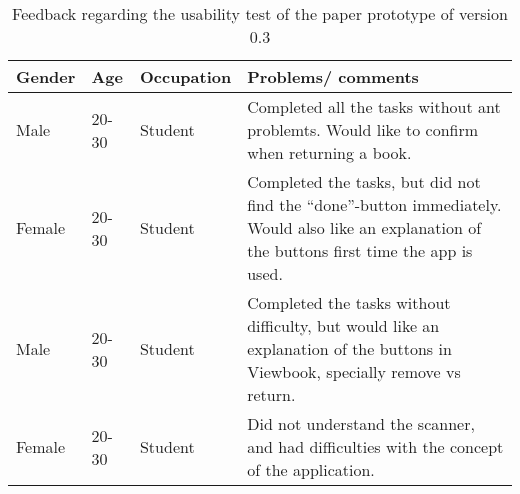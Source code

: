 \begin{table}[]
\centering
\begin{tabular}{|L{1.5cm}|L{1cm}|L{3cm}|L{7cm}|}
\hline
\textbf{Gender} & \textbf{Age} & \textbf{Occupation} & \textbf{Problems/ comments} \\
\hline
Male & 20-30 & Student & Completed all the tasks without ant problemts. Would like to confirm when returning a book. \\
\hline
Female & 20-30 & Student & Completed the tasks, but did not find the “done”-button immediately. Would also like an explanation of the buttons first time the app is used. \\
\hline
Male & 20-30 & Student & Completed the tasks without difficulty, but would like an explanation of the buttons in Viewbook, specially remove vs return. \\
\hline
Female & 20-30 & Student & Did not understand the scanner, and had difficulties with the concept of the application. \\
\hline
\end{tabular}
\caption{Feedback regarding the usability test of the paper prototype of version 0.3}
\label{feedback-3}
\end{table}